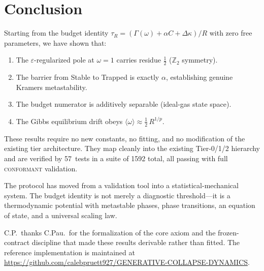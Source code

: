 \documentclass[
  aps,
  prd,
  twocolumn,
  showpacs,
  superscriptaddress,
  nofootinbib,
  floatfix
]{revtex4-2}
\newcommand{\tR}{\tau_{\!R}}
\newcommand{\Gam}{\Gamma}
\newcommand{\eps}{\varepsilon}
\begin{document}
\section{Conclusion}\label{sec:conclusion}

Starting from the budget identity $\tR = (\Gam(\omega)
+ \alpha C + \Delta\kappa)/R$ with zero free parameters,
we have shown that:
\begin{enumerate}
  \item The $\eps$-regularized pole at $\omega=1$ carries
        residue $\tfrac{1}{2}$ ($\mathbb{Z}_2$ symmetry).
  \item The barrier from Stable to Trapped is exactly $\alpha$,
        establishing genuine Kramers metastability.
  \item The budget numerator is additively separable (ideal-gas
        state space).
  \item The Gibbs equilibrium drift obeys
        $\langle\omega\rangle\approx\tfrac{1}{2}\,R^{1/p}$.
\end{enumerate}
These results require no new constants, no fitting, and no
modification of the existing tier architecture.  They map
cleanly into the existing Tier-0/1/2 hierarchy and are verified
by 57~tests in a suite of 1592 total, all passing with full
\textsc{conformant} validation.

The protocol has moved from a validation tool into a
statistical-mechanical system.  The budget identity is not
merely a diagnostic threshold---it is a thermodynamic potential
with metastable phases, phase transitions, an equation of state,
and a universal scaling law.

\begin{acknowledgments}
C.P.\ thanks C.Pau.\ for the formalization of the core axiom
and the frozen-contract discipline that made these results
derivable rather than fitted.
The reference implementation is maintained at
\url{https://github.com/calebpruett927/GENERATIVE-COLLAPSE-DYNAMICS}.
\end{acknowledgments}


\end{document}
